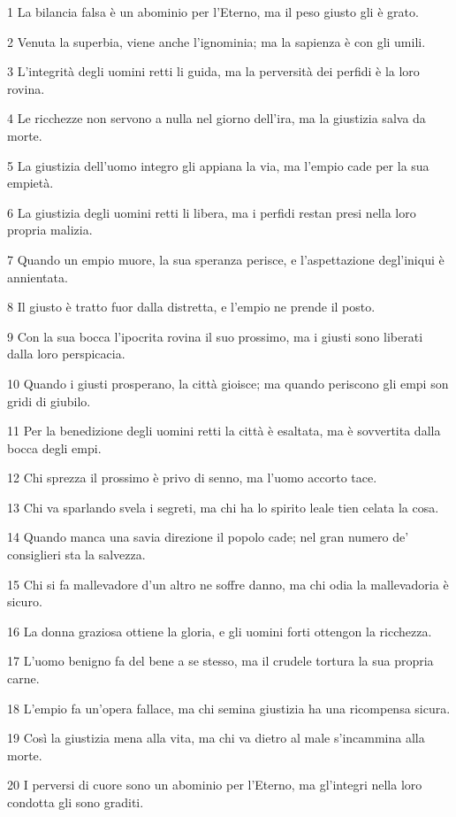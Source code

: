 \par 1 La bilancia falsa è un abominio per l'Eterno, ma il peso giusto gli è grato.
\par 2 Venuta la superbia, viene anche l'ignominia; ma la sapienza è con gli umili.
\par 3 L'integrità degli uomini retti li guida, ma la perversità dei perfidi è la loro rovina.
\par 4 Le ricchezze non servono a nulla nel giorno dell'ira, ma la giustizia salva da morte.
\par 5 La giustizia dell'uomo integro gli appiana la via, ma l'empio cade per la sua empietà.
\par 6 La giustizia degli uomini retti li libera, ma i perfidi restan presi nella loro propria malizia.
\par 7 Quando un empio muore, la sua speranza perisce, e l'aspettazione degl'iniqui è annientata.
\par 8 Il giusto è tratto fuor dalla distretta, e l'empio ne prende il posto.
\par 9 Con la sua bocca l'ipocrita rovina il suo prossimo, ma i giusti sono liberati dalla loro perspicacia.
\par 10 Quando i giusti prosperano, la città gioisce; ma quando periscono gli empi son gridi di giubilo.
\par 11 Per la benedizione degli uomini retti la città è esaltata, ma è sovvertita dalla bocca degli empi.
\par 12 Chi sprezza il prossimo è privo di senno, ma l'uomo accorto tace.
\par 13 Chi va sparlando svela i segreti, ma chi ha lo spirito leale tien celata la cosa.
\par 14 Quando manca una savia direzione il popolo cade; nel gran numero de' consiglieri sta la salvezza.
\par 15 Chi si fa mallevadore d'un altro ne soffre danno, ma chi odia la mallevadoria è sicuro.
\par 16 La donna graziosa ottiene la gloria, e gli uomini forti ottengon la ricchezza.
\par 17 L'uomo benigno fa del bene a se stesso, ma il crudele tortura la sua propria carne.
\par 18 L'empio fa un'opera fallace, ma chi semina giustizia ha una ricompensa sicura.
\par 19 Così la giustizia mena alla vita, ma chi va dietro al male s'incammina alla morte.
\par 20 I perversi di cuore sono un abominio per l'Eterno, ma gl'integri nella loro condotta gli sono graditi.
